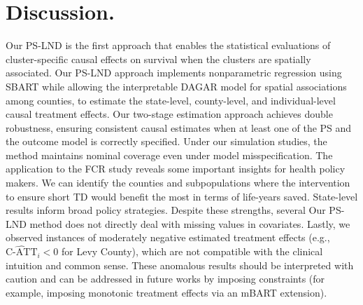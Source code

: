 \documentclass[aoas]{imsart}
\theoremstyle{plain}
\theoremstyle{definition}
\begin{document}
\section{Discussion.}
Our PS-LND is the first approach that enables the statistical evaluations  of cluster-specific causal effects on survival  when the clusters are spatially associated. Our PS-LND approach implements  nonparametric regression using SBART while allowing the interpretable DAGAR model for spatial associations among counties, to estimate the state-level, county-level, and individual-level causal treatment effects. 
Our two-stage estimation approach achieves double robustness, ensuring consistent causal estimates when at least one of the PS and the outcome model is correctly specified. 
Under our simulation studies, the method maintains nominal coverage even under model misspecification. The application to the FCR study reveals some important insights for health policy makers. 
We can identify the counties and subpopulations where the intervention to ensure short TD would benefit the most in terms of life-years saved. %
State-level results inform broad policy strategies. Despite these strengths, several 
Our PS-LND method does not  directly deal with missing values in covariates.
Lastly, we observed instances of moderately negative estimated treatment effects (e.g., $\widehat{\text{C-ATT}}_i < 0$ for Levy County), which are not compatible with the clinical intuition and common sense. These anomalous results should be interpreted with caution and can be addressed in future works by imposing constraints (for example, imposing monotonic treatment effects via an mBART extension).%
\end{document}
